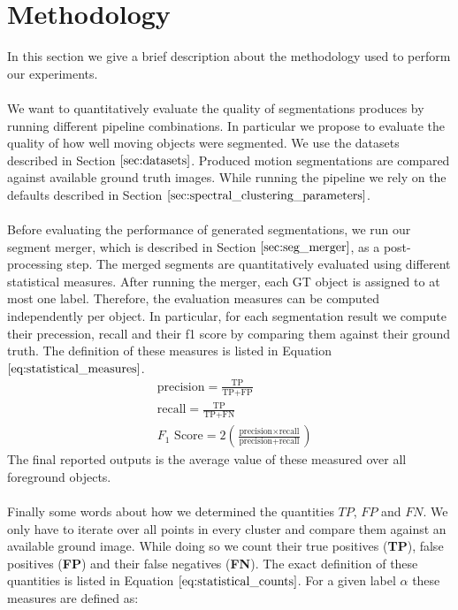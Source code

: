 \section{Methodology}
\label{sec:methodology}
In this section we give a brief description about the methodology used to perform our experiments. \\ \\
We want to quantitatively evaluate the quality of segmentations produces by running different pipeline combinations. In particular we propose to evaluate the quality of how well moving objects were segmented. We use the datasets described in Section $\ref{sec:datasets}$. Produced motion segmentations are compared against available ground truth images. While running the pipeline we rely on the defaults described in Section $\ref{sec:spectral_clustering_parameters}$.\\ \\
Before evaluating the performance of generated segmentations, we run our segment merger, which is described in Section $\ref{sec:seg_merger}$, as a post-processing step. The merged segments are quantitatively evaluated using different statistical measures. After running the merger, each GT object is assigned to at most one label. Therefore, the evaluation measures can be computed independently per object. In particular, for each segmentation result we compute their precession, recall and their f1 score by comparing them against their ground truth. The definition of these measures is listed in Equation $\ref{eq:statistical_measures}$. 
\begin{equation}
\begin{aligned}
	& \text{precision} = \frac{\text{TP}}{\text{TP} + \text{FP}} \\
	& \text{recall} = \frac{\text{TP}}{\text{TP} + \text{FN}} \\
	& F_1 \text{ Score} = 2 \left( \frac{\text{precision} \times \text{recall}}{\text{precision} +\text{recall}} \right)
\end{aligned}
\label{eq:statistical_measures}
\end{equation}
The final reported outputs is the average value of these measured over all foreground objects. \\ \\
Finally some words about how we determined the quantities $TP$, $FP$ and $FN$. We only have to iterate over all points in every cluster and compare them against an available ground image. While doing so we count their true positives (\textbf{TP}), false positives (\textbf{FP}) and their false negatives (\textbf{FN}). The exact definition of these quantities is listed in Equation $\ref{eq:statistical_counts}$. For a given label $\alpha$ these measures are defined as:
